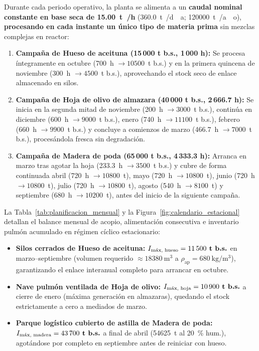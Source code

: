 \documentclass{report}
\begin{document}
Durante cada periodo operativo, la planta se alimenta a un \textbf{caudal nominal constante en base seca de \SI{15.00}{\tonne{}/\hour}} (\SI{360.0}{\tonne{}/d\text{\'\i}a}; \SI{120000}{\tonne{}/ao}), \textbf{procesando en cada instante un único tipo de materia prima} sin mezclas complejas en reactor:
\begin{enumerate}
    \item \textbf{Campaña de Hueso de aceituna (15\,000 t b.s., 1\,000 h):} Se procesa íntegramente en octubre (\num{700}~h $\rightarrow \num{10500}$~t b.s.) y en la primera quincena de noviembre (\num{300}~h $\rightarrow \num{4500}$~t b.s.), aprovechando el stock seco de enlace almacenado en silos.
    \item \textbf{Campaña de Hoja de olivo de almazara (40\,000 t b.s., 2\,666.7 h):} Se inicia en la segunda mitad de noviembre (\num{200}~h $\rightarrow \num{3000}$~t b.s.), continúa en diciembre (\num{600}~h $\rightarrow \num{9000}$~t b.s.), enero (\num{740}~h $\rightarrow \num{11100}$~t b.s.), febrero (\num{660}~h $\rightarrow \num{9900}$~t b.s.) y concluye a comienzos de marzo (\num{466.7}~h $\rightarrow \num{7000}$~t b.s.), procesándola fresca sin degradación.
    \item \textbf{Campaña de Madera de poda (65\,000 t b.s., 4\,333.3 h):} Arranca en marzo tras agotar la hoja (\num{233.3}~h $\rightarrow \num{3500}$~t b.s.) y cubre de forma continuada abril (\num{720}~h $\rightarrow \num{10800}$~t), mayo (\num{720}~h $\rightarrow \num{10800}$~t), junio (\num{720}~h $\rightarrow \num{10800}$~t), julio (\num{720}~h $\rightarrow \num{10800}$~t), agosto (\num{540}~h $\rightarrow \num{8100}$~t) y septiembre (\num{680}~h $\rightarrow \num{10200}$~t), antes del inicio de la siguiente campaña.
\end{enumerate}

La Tabla~\ref{tab:planificacion_mensual} y la Figura~\ref{fig:calendario_estacional} detallan el balance mensual de acopio, alimentación consecutiva e inventario pulmón acumulado en régimen cíclico estacionario:
\begin{itemize}
    \item \textbf{Silos cerrados de Hueso de aceituna:} $I_{\text{máx, hueso}} = \textbf{\num{11500}~t b.s.}$ en marzo--septiembre (volumen requerido $\approx \SI{18380}{\cubic\meter}$ a $\rho_{\text{ap}} = \SI{680}{\kilo\gram/\cubic\meter}$), garantizando el enlace interanual completo para arrancar en octubre.
    \item \textbf{Nave pulmón ventilada de Hoja de olivo:} $I_{\text{máx, hoja}} = \textbf{\num{10900}~t b.s.}$ a cierre de enero (máxima generación en almazaras), quedando el stock estrictamente a cero a mediados de marzo.
    \item \textbf{Parque logístico cubierto de astilla de Madera de poda:} $I_{\text{máx, madera}} = \textbf{\num{43700}~t b.s.}$ a final de abril (\num{54625}~t al \SI{20}{\percent} hum.), agotándose por completo en septiembre antes de reiniciar con hueso.
\end{itemize}
\end{document}
